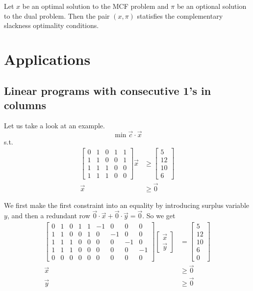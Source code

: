 \documentclass[UTF8,a4paper]{ctexart}
\begin{document}
\begin{theorem}
    Let $x$ be an optimal solution to the MCF problem and $\pi$ be an optional solution to the dual problem.
    Then the pair $(x, \pi)$ statisfies the complementary slackness optimality conditions.
\end{theorem}

\section{Applications}

\subsection{Linear programs with consecutive 1's in columns}

Let us take a look at an example.
\[
    \min \vec{c}\cdot \vec{x}
\]
s.t.
\begin{align*}
    \begin{bmatrix}
        0&1&0&1&1\\
        1&1&0&0&1\\
        1&1&1&0&0\\
        1&1&1&0&0
    \end{bmatrix}
    \vec{x} &\geq \begin{bmatrix}
        5\\
        12\\
        10\\
        6
    \end{bmatrix}
    \\
    \vec{x}&\geq \vec{0}
\end{align*}

We first make the first constraint into an equality by introducing surplus variable $y$,
and then a redundant row $\vec{0}\cdot \vec{x} + \vec{0}\cdot \vec{y}=\vec{0}$.
So we get
\begin{align*}
    \begin{bmatrix}
        0&1&0&1&1& -1&0&0&0\\
        1&1&0&0&1& 0&-1&0&0\\
        1&1&1&0&0& 0&0&-1&0\\
        1&1&1&0&0& 0&0&0&-1\\
        0&0&0&0&0& 0&0&0&0
    \end{bmatrix}
    \begin{bmatrix}
        \vec{x}\\
        \vec{y}
    \end{bmatrix}
    &=\begin{bmatrix}
        5\\
        12\\
        10\\
        6\\
        0
    \end{bmatrix}
    \\ \vec{x}&\geq \vec{0}
    \\ \vec{y}&\geq \vec{0}
\end{align*}
\end{document}
